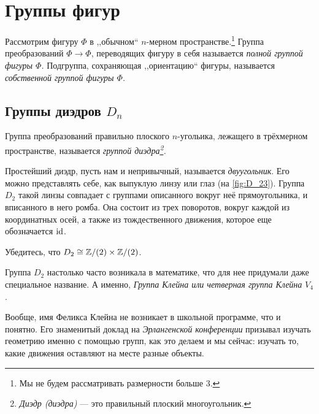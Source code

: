 \section{Группы фигур}
Рассмотрим фигуру $\Phi$ в ,,обычном`` $n$-мерном пространстве.\footnote{Мы не будем рассматривать размерности больше 3.} Группа преобразований $\Phi \to \Phi$, переводящих фигуру в себя называется \emph{полной группой фигуры $\Phi$.} Подгруппа, сохраняющая ,,ориентацию`` фигуры, называется \emph{собственной группой фигуры $\Phi$.}

\subsection{Группы диэдров $D_n$}
\begin{definition}
    Группа преобразований правильно плоского $n$-угольика, лежащего в трёхмерном пространстве, называется \emph{группой диэдра\footnote{\emph{Диэдр (диэдра)} --- это правильный плоский многоугольник.
}.} 
    \end{definition}
Простейший диэдр, пусть нам и непривычный, называется \emph{двуугольник}. Его можно представлять себе, как выпуклую линзу или глаз (на \cref{fig:D_23}). Группа $D_2$ такой линзы совпадает с группами описанного вокруг неё прямоугольника, и вписанного в него ромба. Она состоит из трех поворотов, вокруг каждой из координатных осей, а также из тождественного движения, которое еще обозначается $\operatorname{id}$.

\begin{practice}
    Убедитесь, что $D_2 \cong \mathbb Z/(2) \times \mathbb Z/(2)$.
\end{practice}

Группа $D_2$ настолько часто возникала в математике, что для нее придумали даже специальное название. А именно, \emph{Группа Клейна или четверная группа Клейна} $V_4$.

Вообще, имя Феликса Клейна не возникает в школьной программе, что и понятно. Его знаменитый доклад на \emph{Эрлангенской конференции} призывал изучать геометрию именно с помощью групп, как это делаем и мы сейчас: изучать то, какие движения оставляют на месте разные объекты.

